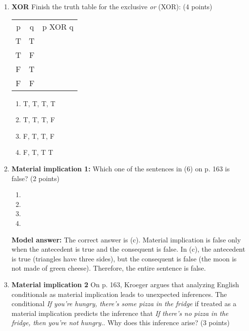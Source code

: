 \documentclass[a4,11pt]{article}
\newcommand{\6}{\mbox{$[\hspace*{-.6mm}[$}}
\newcommand{\9}{\mbox{$]\hspace*{-.6mm}]$}}
\begin{document}
\begin{enumerate}[leftmargin = 12pt]
\item { \bf  XOR} Finish the truth table for the exclusive \textit{or} (XOR): (4 points)

\begin{tabular}{ccc}
p & q & p XOR q \\
T & T & \\
T & F & \\
F & T& \\
F & F & \\
\end{tabular}

\begin{enumerate}[noitemsep]
\item T, T, T, T
\item T, T, T, F
\item F, T, T, F
\item F, T, T T
\end{enumerate}


\item { \bf  Material implication 1:} Which one of the sentences in (6) on p. 163 is false? (2 points)

\begin{enumerate}[noitemsep]
\item 
\item 
\item 
\item 
\end{enumerate}

{ \bf Model answer:}  The correct answer is (c). Material implication is false only when the antecedent is true and the consequent is false. In (c), the antecedent is true (triangles have three sides), but the consequent is false (the moon is not made of green cheese). Therefore, the entire sentence is false.

\item { \bf  Material implication 2} On p. 163, Kroeger argues that analyzing English conditionals as material implication leads to  unexpected inferences. The conditional {\it If you’re hungry, there’s some pizza in the fridge} if treated as a material implication predicts the inference that {\it If there’s no pizza in the fridge, then you’re not hungry.}. Why does this inference arise? (3 points)


\end{enumerate}
\end{document}
